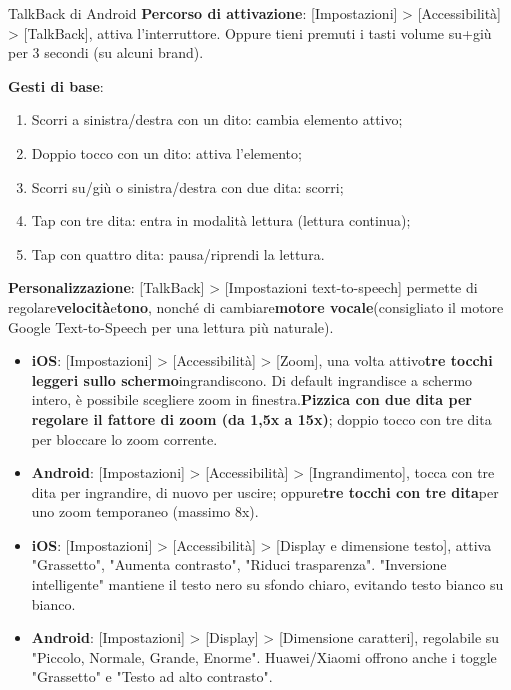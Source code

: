 \begin{tcbinfo}{TalkBack di Android}
\textbf{Percorso di attivazione}: [Impostazioni] > [Accessibilità] > [TalkBack], attiva l'interruttore. Oppure tieni premuti i tasti volume su+giù per 3 secondi (su alcuni brand).

\textbf{Gesti di base}:

\begin{enumerate}
  \item Scorri a sinistra/destra con un dito: cambia elemento attivo;
  \item Doppio tocco con un dito: attiva l'elemento;
  \item Scorri su/giù o sinistra/destra con due dita: scorri;
  \item Tap con tre dita: entra in modalità lettura (lettura continua);
  \item Tap con quattro dita: pausa/riprendi la lettura.
\end{enumerate}

\textbf{Personalizzazione}: [TalkBack] > [Impostazioni text-to-speech] permette di regolare\textbf{velocità}e\textbf{tono}, nonché di cambiare\textbf{motore vocale}(consigliato il motore Google Text-to-Speech per una lettura più naturale).

\end{tcbinfo}



\begin{itemize}
  \item \textbf{iOS}: [Impostazioni] > [Accessibilità] > [Zoom], una volta attivo\textbf{tre tocchi leggeri sullo schermo}ingrandiscono. Di default ingrandisce a schermo intero, è possibile scegliere zoom in finestra.\textbf{Pizzica con due dita per regolare il fattore di zoom (da 1,5x a 15x)}; doppio tocco con tre dita per bloccare lo zoom corrente.
  \item \textbf{Android}: [Impostazioni] > [Accessibilità] > [Ingrandimento], tocca con tre dita per ingrandire, di nuovo per uscire; oppure\textbf{tre tocchi con tre dita}per uno zoom temporaneo (massimo 8x).
\end{itemize}


\begin{itemize}
  \item \textbf{iOS}: [Impostazioni] > [Accessibilità] > [Display e dimensione testo], attiva "Grassetto", "Aumenta contrasto", "Riduci trasparenza". "Inversione intelligente" mantiene il testo nero su sfondo chiaro, evitando testo bianco su bianco.
  \item \textbf{Android}: [Impostazioni] > [Display] > [Dimensione caratteri], regolabile su "Piccolo, Normale, Grande, Enorme". Huawei/Xiaomi offrono anche i toggle "Grassetto" e "Testo ad alto contrasto".
\end{itemize}

